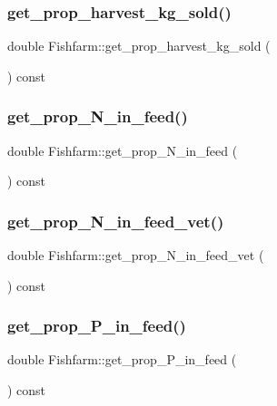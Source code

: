 \subsubsection{\texorpdfstring{get\_prop\_harvest\_kg\_sold()}{get\_prop\_harvest\_kg\_sold()}}
{\footnotesize\ttfamily double Fishfarm\+::get\+\_\+prop\+\_\+harvest\+\_\+kg\+\_\+sold (\begin{DoxyParamCaption}{ }\end{DoxyParamCaption}) const}

\mbox{\label{class_fishfarm_a6737538056c4615cdfe7be7d1881e01b}} 
\subsubsection{\texorpdfstring{get\_prop\_N\_in\_feed()}{get\_prop\_N\_in\_feed()}}
{\footnotesize\ttfamily double Fishfarm\+::get\+\_\+prop\+\_\+\+N\+\_\+in\+\_\+feed (\begin{DoxyParamCaption}{ }\end{DoxyParamCaption}) const}

\mbox{\label{class_fishfarm_a5a9f7bd7cdcfb56233671cd5f9c121b0}} 
\subsubsection{\texorpdfstring{get\_prop\_N\_in\_feed\_vet()}{get\_prop\_N\_in\_feed\_vet()}}
{\footnotesize\ttfamily double Fishfarm\+::get\+\_\+prop\+\_\+\+N\+\_\+in\+\_\+feed\+\_\+vet (\begin{DoxyParamCaption}{ }\end{DoxyParamCaption}) const}

\mbox{\label{class_fishfarm_ac40656b26ce0fa91890a41290dee5dbe}} 
\subsubsection{\texorpdfstring{get\_prop\_P\_in\_feed()}{get\_prop\_P\_in\_feed()}}
{\footnotesize\ttfamily double Fishfarm\+::get\+\_\+prop\+\_\+\+P\+\_\+in\+\_\+feed (\begin{DoxyParamCaption}{ }\end{DoxyParamCaption}) const}

